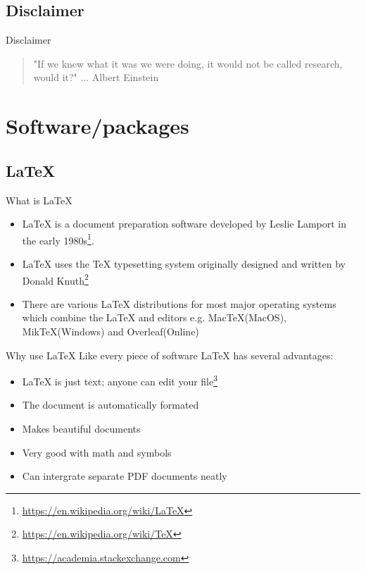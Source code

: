 \documentclass[fleqn]{beamer}\usepackage[]{graphicx}\usepackage[]{color}
\begin{document}
\subsection{Disclaimer}
\begin{frame}{Disclaimer}
\begin{quote}
"If we knew what it was we were doing, it would not be called research, would it?" ... Albert Einstein
\end{quote}
\end{frame}
\section{Software/packages}
\subsection{\LaTeX{}}
\begin{frame}{What is \LaTeX{}}
  \begin{itemize}%
    \item \LaTeX{} is a document preparation software developed by Leslie Lamport in the early 1980s\footnote{\href{https://en.wikipedia.org/wiki/LaTeX}{https://en.wikipedia.org/wiki/LaTeX}}.
    \item \LaTeX{} uses the \TeX{} typesetting system originally designed and written by Donald Knuth\footnote{\href{https://en.wikipedia.org/wiki/TeX}{https://en.wikipedia.org/wiki/TeX}}
    \item There are various \LaTeX{} distributions for most major operating systems which combine the \LaTeX{} and editors e.g. MacTeX(MacOS), MikTeX(Windows) and Overleaf(Online)
  \end{itemize}
\end{frame}

\begin{frame}{Why use \LaTeX{}}
  Like every piece of software \LaTeX{} has several advantages:
  \begin{itemize}%
      \item \LaTeX{} is just text; anyone can edit your file\footnote{\href{https://academia.stackexchange.com/questions/5414/what-are-the-advantages-or-disadvantages-of-using-latex-for-writing-scientific-p}{https://academia.stackexchange.com}}
    \item The document is automatically formated
    \item Makes beautiful documents
    \item Very good with math and symbols
    \item Can intergrate separate PDF documents neatly
  \end{itemize}
\end{frame}
\end{document}
